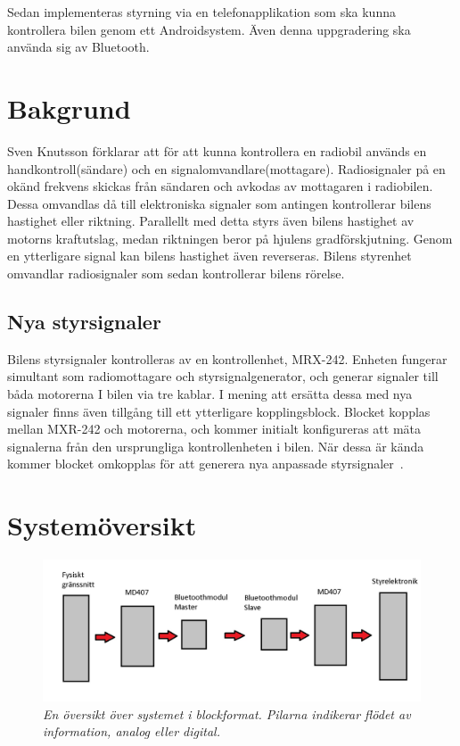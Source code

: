 \documentclass[a4paper]{article}
\begin{document}
Sedan implementeras styrning via en telefonapplikation som ska kunna kontrollera bilen genom ett Androidsystem. Även denna uppgradering ska använda sig av Bluetooth.


\section{Bakgrund}
Sven Knutsson förklarar att för att kunna kontrollera en radiobil används en handkontroll(sändare) och en signalomvandlare(mottagare). Radiosignaler på en okänd frekvens skickas från sändaren och avkodas av mottagaren i radiobilen. Dessa omvandlas då till elektroniska signaler som antingen kontrollerar bilens hastighet eller riktning. Parallellt med detta styrs även bilens hastighet av motorns kraftutslag, medan riktningen beror på hjulens gradförskjutning. Genom en ytterligare signal kan bilens hastighet även reverseras. Bilens styrenhet omvandlar radiosignaler som sedan kontrollerar bilens rörelse.

\subsection{Nya styrsignaler}
Bilens styrsignaler kontrolleras av en kontrollenhet, MRX-242. Enheten fungerar simultant som radiomottagare och styrsignalgenerator, och generar signaler till båda motorerna I bilen via tre kablar. I mening att ersätta dessa med nya signaler finns även tillgång till ett ytterligare kopplingsblock. Blocket kopplas mellan MXR-242 och motorerna, och kommer initialt konfigureras att mäta signalerna från den ursprungliga kontrollenheten i bilen. När dessa är kända kommer blocket omkopplas för att generera nya anpassade styrsignaler~\cite{projektDir}. 

\section{Systemöversikt}

\begin{figure}[H]
\includegraphics[width=\textwidth]{images/systemoversikt.jpg}
\centering
\captionsetup{justification=centering}
\caption{\it En översikt över systemet i blockformat. Pilarna indikerar flödet av information, analog eller digital.}
\end{figure} 
\end{document}
